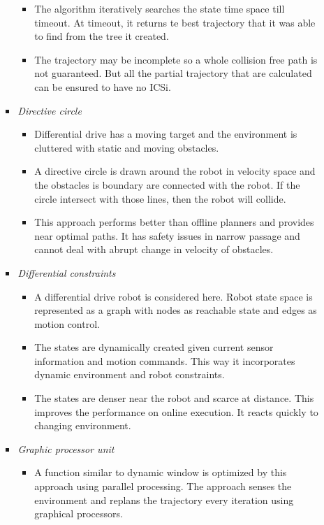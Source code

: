 \documentclass[12pt]{article}
\begin{document}
\begin{itemize}
\begin{itemize}
\begin{itemize}
\begin{itemize}
                \item The algorithm iteratively searches the state time space till timeout. At timeout, it returns te best trajectory that it was able to find from the tree it created.
                \item The trajectory may be incomplete so a whole collision free path is not guaranteed. But all the partial trajectory that are calculated can be ensured to have no ICSi\@.
            \end{itemize}
            \item \textit{Directive circle}
            \begin{itemize}
                \item Differential drive has a moving target and the environment is cluttered with static and moving obstacles.
                \item A directive circle is drawn around the robot in velocity space and the obstacles is boundary are connected with the robot. If the circle intersect with those lines, then the robot will collide.
                \item This approach performs better than offline planners and provides near optimal paths. It has safety issues in narrow passage and cannot deal with abrupt change in velocity of obstacles.
            \end{itemize}
            \item \textit{Differential constraints}
            \begin{itemize}
                \item A differential drive robot is considered here. Robot state space is represented as a graph with nodes as reachable state and edges as motion control.
                \item The states are dynamically created given current sensor information and motion commands. This way it incorporates dynamic environment and robot constraints.
                \item The states are denser near the robot and scarce at distance. This improves the performance on online execution. It reacts quickly to changing environment.
            \end{itemize}
            \item \textit{Graphic processor unit}
            \begin{itemize}
                \item A function similar to dynamic window is optimized by this approach using parallel processing. The approach senses the environment and replans the trajectory every iteration using graphical processors.

\end{itemize}
\end{itemize}
\end{itemize}
\end{itemize}
\end{document}
